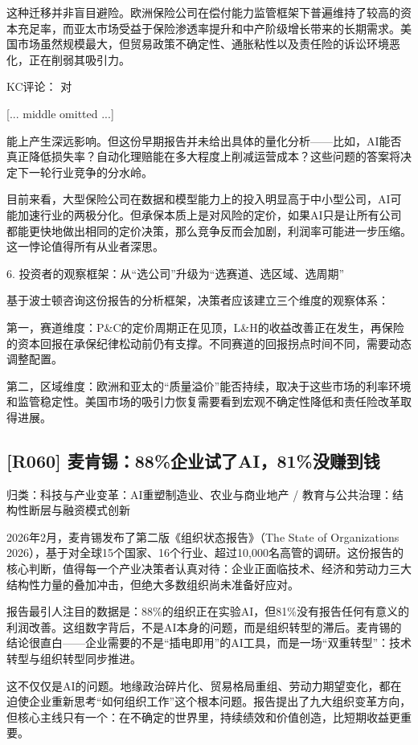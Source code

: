 \documentclass[11pt]{ctexart}
\begin{document}
这种迁移并非盲目避险。欧洲保险公司在偿付能力监管框架下普遍维持了较高的资本充足率，而亚太市场受益于保险渗透率提升和中产阶级增长带来的长期需求。美国市场虽然规模最大，但贸易政策不确定性、通胀粘性以及责任险的诉讼环境恶化，正在削弱其吸引力。

KC评论： 对

[... middle omitted ...]

能上产生深远影响。但这份早期报告并未给出具体的量化分析——比如，AI能否真正降低损失率？自动化理赔能在多大程度上削减运营成本？这些问题的答案将决定下一轮行业竞争的分水岭。

目前来看，大型保险公司在数据和模型能力上的投入明显高于中小型公司，AI可能加速行业的两极分化。但承保本质上是对风险的定价，如果AI只是让所有公司都能更快地做出相同的定价决策，那么竞争反而会加剧，利润率可能进一步压缩。这一悖论值得所有从业者深思。

6. 投资者的观察框架：从“选公司”升级为“选赛道、选区域、选周期”

基于波士顿咨询这份报告的分析框架，决策者应该建立三个维度的观察体系：

第一，赛道维度：P\&C的定价周期正在见顶，L\&H的收益改善正在发生，再保险的资本回报在承保纪律松动前仍有支撑。不同赛道的回报拐点时间不同，需要动态调整配置。

第二，区域维度：欧洲和亚太的“质量溢价”能否持续，取决于这些市场的利率环境和监管稳定性。美国市场的吸引力恢复需要看到宏观不确定性降低和责任险改革取得进展。

\subsection{[R060] 麦肯锡：88\%企业试了AI，81\%没赚到钱}
{\small\color{refgray}归类：科技与产业变革：AI重塑制造业、农业与商业地产 / 教育与公共治理：结构性断层与融资模式创新}

2026年2月，麦肯锡发布了第二版《组织状态报告》（The State of Organizations 2026），基于对全球15个国家、16个行业、超过10,000名高管的调研。这份报告的核心判断，值得每一个产业决策者认真对待：企业正面临技术、经济和劳动力三大结构性力量的叠加冲击，但绝大多数组织尚未准备好应对。

报告最引人注目的数据是：88\%的组织正在实验AI，但81\%没有报告任何有意义的利润改善。这组数字背后，不是AI本身的问题，而是组织转型的滞后。麦肯锡的结论很直白——企业需要的不是“插电即用”的AI工具，而是一场“双重转型”：技术转型与组织转型同步推进。

这不仅仅是AI的问题。地缘政治碎片化、贸易格局重组、劳动力期望变化，都在迫使企业重新思考“如何组织工作”这个根本问题。报告提出了九大组织变革方向，但核心主线只有一个：在不确定的世界里，持续绩效和价值创造，比短期收益更重要。
\end{document}
